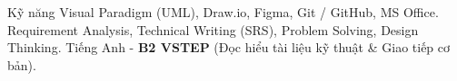 \begin{rubric}{Kỹ năng}
\entry*[Công cụ]
    Visual Paradigm (UML), Draw.io, Figma, Git / GitHub, MS Office.
    Requirement Analysis, Technical Writing (SRS), Problem Solving, Design Thinking.
    Tiếng Anh - \textbf{B2 VSTEP} (Đọc hiểu tài liệu kỹ thuật \& Giao tiếp cơ bản).
\end{rubric}
